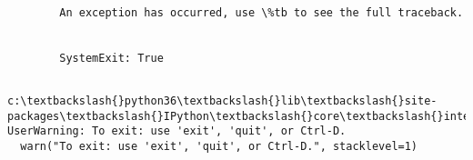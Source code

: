 \documentclass[11pt]{article}
\begin{document}
    \begin{Verbatim}[commandchars=\\\{\}]

        An exception has occurred, use \%tb to see the full traceback.
    

        SystemExit: True
    

    \end{Verbatim}

    \begin{Verbatim}[commandchars=\\\{\}]
c:\textbackslash{}python36\textbackslash{}lib\textbackslash{}site-packages\textbackslash{}IPython\textbackslash{}core\textbackslash{}interactiveshell.py:2918: UserWarning: To exit: use 'exit', 'quit', or Ctrl-D.
  warn("To exit: use 'exit', 'quit', or Ctrl-D.", stacklevel=1)

    \end{Verbatim}


    
    
    
    
\end{document}
